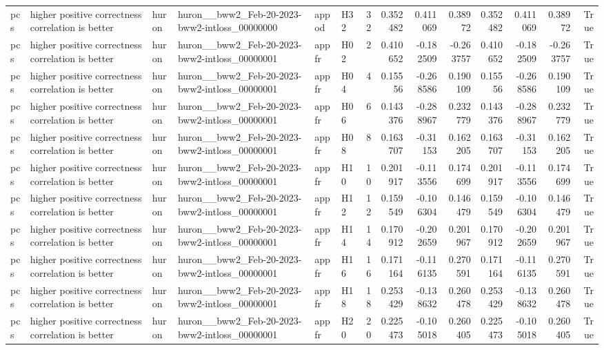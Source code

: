 \begin{longtable}{llllllrrrrrrrr}
pcs & higher positive correctness correlation is better & huron & huron\_\_bww2\_Feb-20-2023-bww2-intloss\_00000000 & appod & H32 & 32 & 0.352482 & 0.411069 & 0.38972 & 0.352482 & 0.411069 & 0.38972 & True \\
pcs & higher positive correctness correlation is better & huron & huron\_\_bww2\_Feb-20-2023-bww2-intloss\_00000001 & appfr & H02 & 2 & 0.410652 & -0.182509 & -0.263757 & 0.410652 & -0.182509 & -0.263757 & True \\
pcs & higher positive correctness correlation is better & huron & huron\_\_bww2\_Feb-20-2023-bww2-intloss\_00000001 & appfr & H04 & 4 & 0.15556 & -0.268586 & 0.190109 & 0.15556 & -0.268586 & 0.190109 & True \\
pcs & higher positive correctness correlation is better & huron & huron\_\_bww2\_Feb-20-2023-bww2-intloss\_00000001 & appfr & H06 & 6 & 0.143376 & -0.288967 & 0.232779 & 0.143376 & -0.288967 & 0.232779 & True \\
pcs & higher positive correctness correlation is better & huron & huron\_\_bww2\_Feb-20-2023-bww2-intloss\_00000001 & appfr & H08 & 8 & 0.163707 & -0.31153 & 0.162205 & 0.163707 & -0.31153 & 0.162205 & True \\
pcs & higher positive correctness correlation is better & huron & huron\_\_bww2\_Feb-20-2023-bww2-intloss\_00000001 & appfr & H10 & 10 & 0.201917 & -0.113556 & 0.174699 & 0.201917 & -0.113556 & 0.174699 & True \\
pcs & higher positive correctness correlation is better & huron & huron\_\_bww2\_Feb-20-2023-bww2-intloss\_00000001 & appfr & H12 & 12 & 0.159549 & -0.106304 & 0.146479 & 0.159549 & -0.106304 & 0.146479 & True \\
pcs & higher positive correctness correlation is better & huron & huron\_\_bww2\_Feb-20-2023-bww2-intloss\_00000001 & appfr & H14 & 14 & 0.170912 & -0.202659 & 0.201967 & 0.170912 & -0.202659 & 0.201967 & True \\
pcs & higher positive correctness correlation is better & huron & huron\_\_bww2\_Feb-20-2023-bww2-intloss\_00000001 & appfr & H16 & 16 & 0.171164 & -0.116135 & 0.270591 & 0.171164 & -0.116135 & 0.270591 & True \\
pcs & higher positive correctness correlation is better & huron & huron\_\_bww2\_Feb-20-2023-bww2-intloss\_00000001 & appfr & H18 & 18 & 0.253429 & -0.138632 & 0.260478 & 0.253429 & -0.138632 & 0.260478 & True \\
pcs & higher positive correctness correlation is better & huron & huron\_\_bww2\_Feb-20-2023-bww2-intloss\_00000001 & appfr & H20 & 20 & 0.225473 & -0.105018 & 0.260405 & 0.225473 & -0.105018 & 0.260405 & True \\

\end{longtable}
